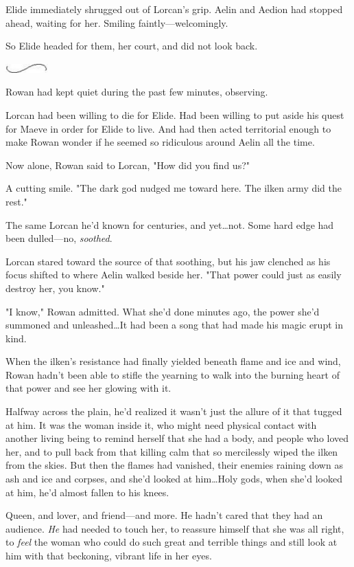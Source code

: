 Elide immediately shrugged out of Lorcan's grip.
Aelin and Aedion had stopped ahead, waiting for her.
Smiling faintly---welcomingly.

So Elide headed for them, her court, and did not look back.

\begin{center}
	\includegraphics[width=0.65in,height=0.13in]{images/seperator}
\end{center}

Rowan had kept quiet during the past few minutes, observing.

Lorcan had been willing to die for Elide.
Had been willing to put aside his quest for Maeve in order for Elide to live.
And had then acted territorial enough to make Rowan wonder if he seemed so ridiculous around Aelin all the time.

Now alone, Rowan said to Lorcan, "How did you find us?"

A cutting smile.
"The dark god nudged me toward here.
The ilken army did the rest."

The same Lorcan he'd known for centuries, and yet\ldots not.
Some hard edge had been dulled---no, \emph{soothed}.

Lorcan stared toward the source of that soothing, but his jaw clenched as his focus shifted to where Aelin walked beside her.
"That power could just as easily destroy her, you know."

"I know," Rowan admitted.
What she'd done minutes ago, the power she'd summoned and unleashed\ldots It had been a song that had made his magic erupt in kind.

When the ilken's resistance had finally yielded beneath flame and ice and wind, Rowan hadn't been able to stifle the yearning to walk into the burning heart of that power and see her glowing with it.

Halfway across the plain, he'd realized it wasn't just the allure of it that tugged at him.
It was the woman inside it, who might need physical contact with another living being to remind herself that she had a body, and people who loved her, and to pull back from that killing calm that so mercilessly wiped the ilken from the skies.
But then the flames had vanished, their enemies raining down as ash and ice and corpses, and she'd looked at him\ldots Holy gods, when she'd looked at him, he'd almost fallen to his knees.

Queen, and lover, and friend---and more.
He hadn't cared that they had an audience.
\emph{He} had needed to touch her, to reassure himself that she was all right, to \emph{feel} the woman who could do such great and terrible things and still look at him with that beckoning, vibrant life in her eyes.

